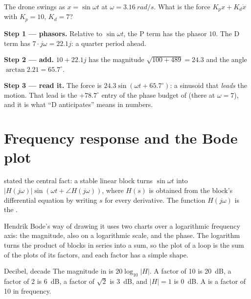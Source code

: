 \begin{example}
\label{ex:C-pd}
The drone swings as $x = \sin\omega t$ at $\omega = \SI{3.16}{rad/s}$. What is the force $K_px + K_d\dot x$ with $K_p = 10$, $K_d = 7$?

\textbf{Step 1 — phasors.} Relative to $\sin\omega t$, the P term has the phasor $10$. The D term has $7 \cdot j\omega = 22.1j$: a quarter period ahead.

\textbf{Step 2 — add.} $10 + 22.1j$ has the magnitude $\sqrt{100 + 489} = 24.3$ and the angle $\arctan 2.21 = 65.7^\circ$.

\textbf{Step 3 — read it.} The force is $24.3\sin(\omega t + 65.7^\circ)$: a sinusoid that \emph{leads} the motion. That lead is the $+78.7^\circ$ entry of the phase budget of  (there at $\omega = 7$), and it is what \enquote{D anticipates} means in numbers.
\end{example}

\section{Frequency response and the Bode plot}

 stated the central fact: a stable linear block turns $\sin\omega t$ into $|H(j\omega)|\sin(\omega t + \angle H(j\omega))$, where $H(s)$ is obtained from the block's differential equation by writing $s$ for every derivative. The function $H(j\omega)$ is the .

Hendrik Bode's way of drawing it uses two charts over a logarithmic frequency axis: the magnitude, also on a logarithmic scale, and the phase. The logarithm turns the product of blocks in series into a sum, so the plot of a loop is the sum of the plots of its factors, and each factor has a simple shape.

\begin{definition}{Decibel, decade}
The magnitude in  is $20\log_{10}|H|$. A factor of 10 is \SI{20}{dB}, a factor of 2 is \SI{6}{dB}, a factor of $\sqrt2$ is \SI{3}{dB}, and $|H| = 1$ is \SI{0}{dB}. A  is a factor of 10 in frequency.
\end{definition}

